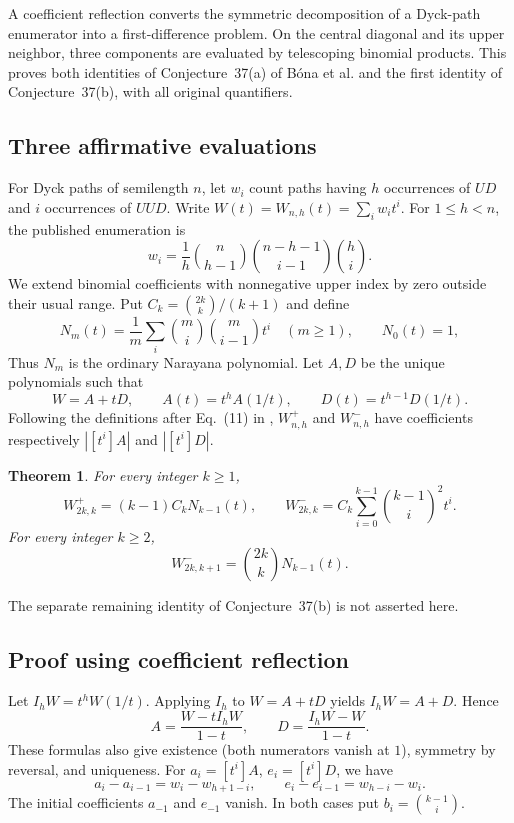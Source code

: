 \documentclass[11pt,a4paper]{article}
\numberwithin{equation}{section}
\newtheorem{theorem}{Theorem}[section]
\theoremstyle{definition}
\theoremstyle{remark}
\newenvironment{sectionabstract}{\par\smallskip\begingroup\small\noindent}{\par\endgroup\medskip}
\begin{document}
\begin{sectionabstract}
A coefficient reflection converts the symmetric decomposition of a Dyck-path enumerator into a first-difference problem. On the central diagonal and its upper neighbor, three components are evaluated by telescoping binomial products. This proves both identities of Conjecture~37(a) of B\'ona et al. and the first identity of Conjecture~37(b), with all original quantifiers.
\end{sectionabstract}
\subsection{Three affirmative evaluations}
For Dyck paths of semilength $n$, let $w_i$ count paths having $h$ occurrences of $UD$ and $i$ occurrences of $UUD$. Write $W(t)=W_{n,h}(t)=\sum_i w_it^i$. For $1\le h<n$, the published enumeration \cite[Theorem~2]{r29keio:bona} is
\begin{equation}
 w_i=\frac1h\binom{n}{h-1}\binom{n-h-1}{i-1}\binom{h}{i}.\label{r29keio:eq:counts}
\end{equation}
We extend binomial coefficients with nonnegative upper index by zero outside their usual range. Put $C_k=\binom{2k}{k}/(k+1)$ and define
\[
 N_m(t)=\frac1m\sum_i\binom mi\binom{m}{i-1}t^i\quad(m\ge1),\qquad N_0(t)=1,
\]
Thus $N_m$ is the ordinary Narayana polynomial. Let $A,D$ be the unique polynomials such that
\[
 W=A+tD,\qquad A(t)=t^hA(1/t),\qquad D(t)=t^{h-1}D(1/t).
\]
Following the definitions after Eq.~(11) in \cite{r29keio:bona}, $W^+_{n,h}$ and $W^-_{n,h}$ have coefficients respectively $|[t^i]A|$ and $|[t^i]D|$.
\begin{theorem}\label{r29keio:th:main}
For every integer $k\ge1$,
\[
 W^+_{2k,k}=(k-1)C_kN_{k-1}(t),\qquad
 W^-_{2k,k}=C_k\sum_{i=0}^{k-1}\binom{k-1}{i}^{\!2}t^i.
\]
For every integer $k\ge2$,
\[
 W^-_{2k,k+1}=\binom{2k}{k}N_{k-1}(t).
\]
\end{theorem}
The separate remaining identity of Conjecture~37(b) is not asserted here.
\subsection{Proof using coefficient reflection}
Let $I_h W=t^hW(1/t)$. Applying $I_h$ to $W=A+tD$ yields $I_hW=A+D$. Hence
\[
 A=\frac{W-t I_hW}{1-t},\qquad D=\frac{I_hW-W}{1-t}.
\]
These formulas also give existence (both numerators vanish at $1$), symmetry by reversal, and uniqueness. For $a_i=[t^i]A$, $e_i=[t^i]D$, we have
\begin{equation}
 a_i-a_{i-1}=w_i-w_{h+1-i},\qquad e_i-e_{i-1}=w_{h-i}-w_i.\label{r29keio:eq:diff}
\end{equation}
The initial coefficients $a_{-1}$ and $e_{-1}$ vanish. In both cases put $b_i=\binom{k-1}{i}$.
\end{document}
